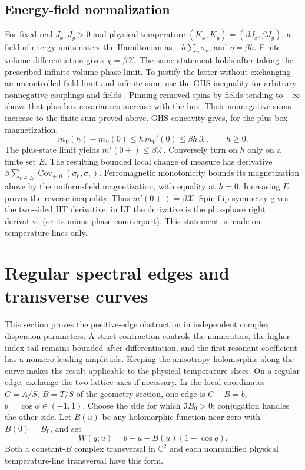 \documentclass[11pt]{article}
\numberwithin{equation}{section}
\theoremstyle{definition}
\newcommand{\C}{\mathbb C}
\begin{document}
\subsection{Energy-field normalization}

For fixed real \(J_x,J_y>0\) and physical temperature
\((K_x,K_y)=(\beta J_x,\beta J_y)\), a field of energy units enters
the Hamiltonian as \(-h\sum_v\sigma_v\), and \(\eta=\beta h\).
Finite-volume differentiation gives \(\chi=\beta\mathcal X\).
The same statement holds after taking the prescribed infinite-volume
phase limit. To justify the latter without exchanging an uncontrolled
field limit and infinite sum, use the GHS inequality for arbitrary
nonnegative couplings and fields \cite[Theorem 1.5]{CGN}.
Pinning removed spins by fields tending to \(+\infty\) shows that
plus-box covariances increase with the box. Their nonnegative sums
increase to the finite sum proved above. GHS concavity gives, for
the plus-box magnetization,
\[
 m_V(h)-m_V(0)\le h\,m_V'(0)
       \le\beta h\,\mathcal X,\qquad h\ge0.
\]
The plus-state limit yields \(m'(0+)\le\beta\mathcal X\).
Conversely turn on \(h\) only on a finite set \(E\). The resulting
bounded local change of measure has derivative
\(\beta\sum_{v\in E}\operatorname{Cov}_{+,0}(\sigma_0,\sigma_v)\).
Ferromagnetic monotonicity bounds its magnetization above by the
uniform-field magnetization, with equality at \(h=0\).
Increasing \(E\) proves the reverse inequality. Thus
\(m'(0+)=\beta\mathcal X\). Spin-flip symmetry gives the two-sided
HT derivative; in LT the derivative is the plus-phase right
derivative (or its minus-phase counterpart).
This statement is made on temperature lines only.

\section{Regular spectral edges and transverse curves}
\label{ana:edges}

This section proves the positive-edge obstruction in independent
complex dispersion parameters. A strict contraction controls the
numerators, the higher-index tail remains bounded after differentiation,
and the first resonant coefficient has a nonzero leading amplitude.
Keeping the anisotropy holomorphic along the curve makes the result
applicable to the physical temperature slices.
On a regular edge, exchange the two lattice axes if necessary.
In the local coordinates \(C=A/S,\ B=T/S\) of the geometry section,
one edge is \(C-B=b\), \(b=\cos\phi\in(-1,1)\).
Choose the side for which \(\Im B_0>0\); conjugation handles the
other side. Let \(B(u)\) be any holomorphic function near zero with
\(B(0)=B_0\), and set
\begin{equation}\label{ana:edgecurve}
 W(q;u)=b+u+B(u)(1-\cos q).
\end{equation}
Both a constant-\(B\) complex transversal in \(\C^2\) and each
nonramified physical temperature-line transversal have this form.
\end{document}

